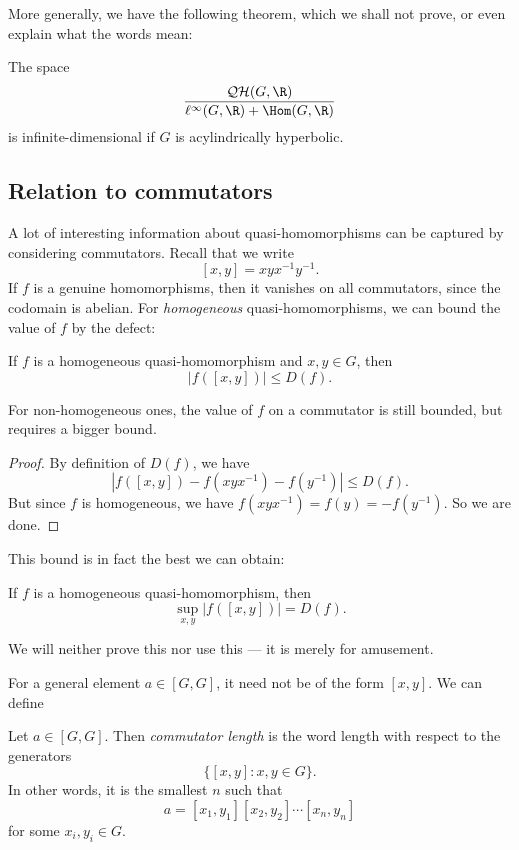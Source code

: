 \documentclass[a4paper]{article}
\newcommand\QH{\mathcal{QH}}
\begin{document}
More generally, we have the following theorem, which we shall not prove, or even explain what the words mean:
\begin{thm}
  The space
  \[
    \frac{\QH(G, \R)}{\ell^\infty(G, \R) + \Hom(G, \R)}
  \]
  is infinite-dimensional if $G$ is acylindrically hyperbolic.
\end{thm}

\subsection{Relation to commutators}
A lot of interesting information about quasi-homomorphisms can be captured by considering commutators. Recall that we write
\[
  [x, y] = xyx^{-1}y^{-1}.
\]
If $f$ is a genuine homomorphisms, then it vanishes on all commutators, since the codomain is abelian. For \emph{homogeneous} quasi-homomorphisms, we can bound the value of $f$ by the defect:
\begin{lemma}
  If $f$ is a homogeneous quasi-homomorphism and $x, y \in G$, then
  \[
    |f([x, y])| \leq D(f).
  \]
\end{lemma}
For non-homogeneous ones, the value of $f$ on a commutator is still bounded, but requires a bigger bound.

\begin{proof}
  By definition of $D(f)$, we have
  \[
    |f([x, y]) - f(xyx^{-1}) - f(y^{-1})| \leq D(f).
  \]
  But since $f$ is homogeneous, we have $f(xyx^{-1}) = f(y) = - f(y^{-1})$. So we are done.
\end{proof}

This bound is in fact the best we can obtain:
\begin{lemma}[Bavard, 1992]
  If $f$ is a homogeneous quasi-homomorphism, then
  \[
    \sup_{x, y} |f([x, y])| = D(f).
  \]
\end{lemma}
We will neither prove this nor use this --- it is merely for amusement.

For a general element $a \in [G, G]$, it need not be of the form $[x, y]$. We can define
\begin{defi}
  Let $a \in [G, G]$. Then \emph{commutator length}  is the word length with respect to the generators
  \[
    \{[x, y] : x, y \in G\}.
  \]
  In other words, it is the smallest $n$ such that
  \[
    a = [x_1, y_1][x_2, y_2] \cdots [x_n, y_n]
  \]
  for some $x_i, y_i \in G$.
\end{defi}
\end{document}
